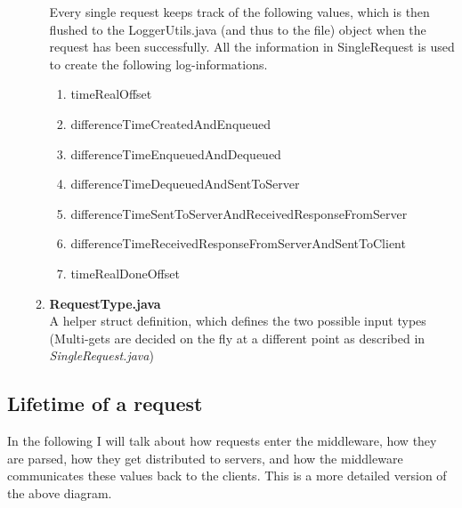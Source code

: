 \documentclass[11pt,a4paper]{article}
\begin{document}
\begin{enumerate}
\begin{enumerate}
Every single request keeps track of the following values, 
which is then flushed to the LoggerUtils.java (and thus to the file)
object when the request has been successfully.
All the information in SingleRequest is used to create the following log-informations.

\begin{enumerate}
\item timeRealOffset
\item differenceTimeCreatedAndEnqueued
\item differenceTimeEnqueuedAndDequeued
\item differenceTimeDequeuedAndSentToServer
\item differenceTimeSentToServerAndReceivedResponseFromServer
\item differenceTimeReceivedResponseFromServerAndSentToClient
\item timeRealDoneOffset
\end{enumerate}

\item \textbf{RequestType.java} \\
A helper struct definition, which defines the two possible input types (Multi-gets are decided on the fly at a different point as described in \textit{SingleRequest.java})

\end{enumerate}

\end{enumerate}

\subsection{Lifetime of a request}
In the following I will talk about how requests enter the middleware, how they are parsed, how they get distributed to servers, and how the middleware communicates these values back to the clients. 
This is a more detailed version of the above diagram.\\
\end{document}
